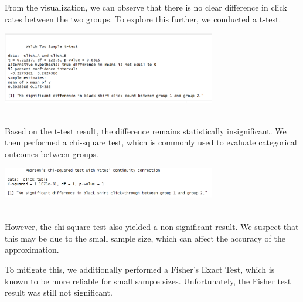 \documentclass[
  letterpaper,
  DIV=11,
  numbers=noendperiod]{scrartcl}
\begin{document}
From the visualization, we can observe that there is no clear difference
in click rates between the two groups. To explore this further, we
conducted a t-test.\\

\begin{center}
\includegraphics[width=0.7\textwidth,height=\textheight]{data_ana_pj3_files/t_test_result.png}
\end{center}
\\

Based on the t-test result, the difference remains statistically
insignificant. We then performed a chi-square test, which is commonly
used to evaluate categorical outcomes between groups.\\

\begin{center}
\includegraphics[width=0.7\textwidth,height=\textheight]{data_ana_pj3_files/chi_square.png}
\end{center}
\\

However, the chi-square test also yielded a non-significant result. We
suspect that this may be due to the small sample size, which can affect
the accuracy of the approximation.

To mitigate this, we additionally performed a Fisher's Exact Test, which
is known to be more reliable for small sample sizes. Unfortunately, the
Fisher test result was still not significant.
\end{document}
